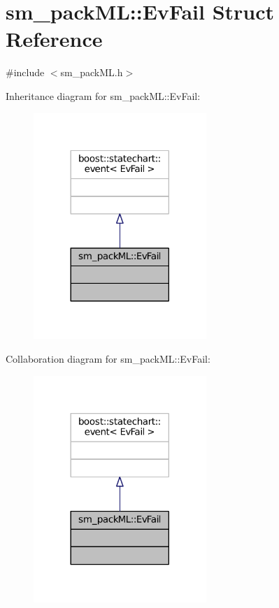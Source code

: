\hypertarget{structsm__packML_1_1EvFail}{}\section{sm\+\_\+pack\+ML\+:\+:Ev\+Fail Struct Reference}
\label{structsm__packML_1_1EvFail}


{\ttfamily \#include $<$sm\+\_\+pack\+M\+L.\+h$>$}



Inheritance diagram for sm\+\_\+pack\+ML\+:\+:Ev\+Fail\+:
\nopagebreak
\begin{figure}[H]
\begin{center}
\leavevmode
\includegraphics[width=185pt]{structsm__packML_1_1EvFail__inherit__graph}
\end{center}
\end{figure}


Collaboration diagram for sm\+\_\+pack\+ML\+:\+:Ev\+Fail\+:
\nopagebreak
\begin{figure}[H]
\begin{center}
\leavevmode
\includegraphics[width=185pt]{structsm__packML_1_1EvFail__coll__graph}
\end{center}
\end{figure}


